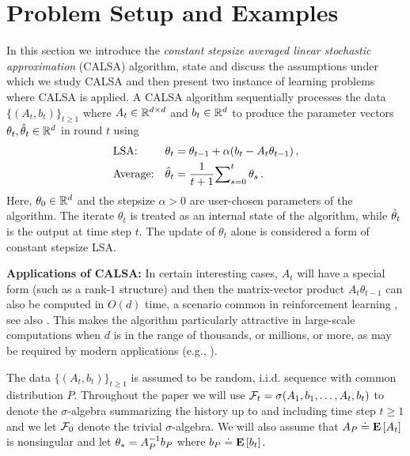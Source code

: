 \section{Problem Setup and Examples}\label{sec:prob}
In this section we introduce the \emph{constant stepsize averaged linear stochastic approximation} (CALSA) algorithm, state and discuss the assumptions under which we study CALSA and then present two instance of learning problems where CALSA is applied. A CALSA algorithm sequentially processes the data $\{(A_t,b_t)\}_{t\ge 1}$ 
where $A_t\in \mathbb{R}^{d \times d}$ and $b_t\in \mathbb{R}^d$ to produce the parameter vectors 
$\theta_t,\hat{\theta}_t\in \mathbb{R}^{d}$ in round $t$ using 
\begin{subequations}\label{eq:lsa}
\begin{align}
\label{conststep}&\text{LSA:} &\theta_t&=\theta_{t-1}+\alpha(b_t-A_t\theta_{t-1})\,,\\
\label{iteravg}&\text{Average:} &\hat{\theta}_t&=\frac{1}{t+1}{\sum}_{s=0}^{t}\,\theta_s\,.
\end{align}
\end{subequations}
Here, $\theta_0\in \mathbb{R}^d$ and the stepsize $\alpha>0$ are user-chosen parameters of the algorithm. 
The iterate $\theta_t$ is treated as an internal state of the algorithm, while $\hat{\theta}_t$ is the output at time step $t$. The update of $\theta_t$ alone is considered a form of constant stepsize LSA.

\textbf{Applications of CALSA:} In certain interesting cases, $A_t$ will have a special form (such as a rank-$1$ structure) and then the matrix-vector product $A_t \theta_{t-1}$ can also be computed in $O(d)$ time, a scenario common in reinforcement learning \cite{sutton,konda-tsitsiklis,gtd,gtd2,gtdmp}, see also . This makes the algorithm particularly attractive in large-scale computations when $d$ is in the range of thousands, or millions, or more, as may be required by modern applications (e.g., \citep{LiMaTaBo16}). 
\fi

The data $\{(A_t,b_t)\}_{t\ge 1}$ is assumed to be random, i.i.d. sequence with common distribution $P$. 
Throughout the paper we will use
$\mathcal{F}_t = \sigma(A_1,b_1,\dots,A_t,b_t)$ to denote the $\sigma$-algebra summarizing the history up to and
including time step $t\ge 1$ and we let $\mathcal{F}_0$ denote the trivial $\sigma$-algebra. We will also assume
that $A_P \doteq \mathbf{E}\left[A_t\right]$ is nonsingular and let $\theta_* = A_P^{-1} b_P$ where $b_P \doteq \mathbf{E}\left[b_t\right]$.

